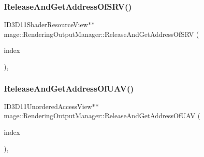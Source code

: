 \hypertarget{classmage_1_1_rendering_output_manager_ab6b8045718c2dbfc8b64c23d220a2288}{}\label{classmage_1_1_rendering_output_manager_ab6b8045718c2dbfc8b64c23d220a2288} 
\subsubsection{\texorpdfstring{Release\+And\+Get\+Address\+Of\+S\+R\+V()}{ReleaseAndGetAddressOfSRV()}}
{\footnotesize\ttfamily I\+D3\+D11\+Shader\+Resource\+View$\ast$$\ast$ mage\+::\+Rendering\+Output\+Manager\+::\+Release\+And\+Get\+Address\+Of\+S\+RV (\begin{DoxyParamCaption}\item[{\hyperlink{classmage_1_1_rendering_output_manager_a25aa12ba77bb160c5641cf54f7a68a29}{S\+R\+V\+Index}}]{index }\end{DoxyParamCaption})\hspace{0.3cm}{\ttfamily [private]}, {\ttfamily [noexcept]}}

\hypertarget{classmage_1_1_rendering_output_manager_acd5d6a8feb5a7d9aa41667be0cef617b}{}\label{classmage_1_1_rendering_output_manager_acd5d6a8feb5a7d9aa41667be0cef617b} 
\subsubsection{\texorpdfstring{Release\+And\+Get\+Address\+Of\+U\+A\+V()}{ReleaseAndGetAddressOfUAV()}}
{\footnotesize\ttfamily I\+D3\+D11\+Unordered\+Access\+View$\ast$$\ast$ mage\+::\+Rendering\+Output\+Manager\+::\+Release\+And\+Get\+Address\+Of\+U\+AV (\begin{DoxyParamCaption}\item[{\hyperlink{classmage_1_1_rendering_output_manager_a34cdd58dd0dda9d78878d79aa3393b89}{U\+A\+V\+Index}}]{index }\end{DoxyParamCaption})\hspace{0.3cm}{\ttfamily [private]}, {\ttfamily [noexcept]}}

